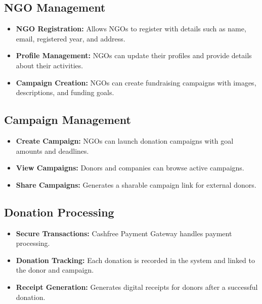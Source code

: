\subsection{NGO Management}
\begin{itemize}
    \item \textbf{NGO Registration:} Allows NGOs to register with details such as name, email, registered year, and address.
    \item \textbf{Profile Management:} NGOs can update their profiles and provide details about their activities.
    \item \textbf{Campaign Creation:} NGOs can create fundraising campaigns with images, descriptions, and funding goals.
\end{itemize}

\subsection{Campaign Management}
\begin{itemize}
    \item \textbf{Create Campaign:} NGOs can launch donation campaigns with goal amounts and deadlines.
    \item \textbf{View Campaigns:} Donors and companies can browse active campaigns.
    \item \textbf{Share Campaigns:} Generates a sharable campaign link for external donors.
\end{itemize}

\subsection{Donation Processing}
\begin{itemize}
    \item \textbf{Secure Transactions:} Cashfree Payment Gateway handles payment processing.
    \item \textbf{Donation Tracking:} Each donation is recorded in the system and linked to the donor and campaign.
    \item \textbf{Receipt Generation:} Generates digital receipts for donors after a successful donation.
\end{itemize}

